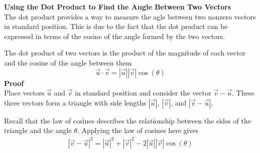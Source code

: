 \documentclass[a4paper]{article}
\let\bf\textbf
\begin{document}
\noindent\bf{Using the Dot Product to Find the Angle Between Two Vectors}
\vspace{1mm}\\
The dot product provides a way to measure the agle between two nonzero vectors in standard position. This is due to the fact that the dot product can be expressed in terms of the cosine of the angle formed by the two vectors.
\begin{center}
\end{center}
\noindent The dot product of two vectors is the product of the magnitude of each vector and the cosine of the angle between them
\setcounter{equation}{3}
\begin{equation}
    \vec{u} \cdot \vec{v} = |\vec{u}||\vec{v}|\cos(\theta)
\end{equation}
\newpage
\noindent\bf{Proof}
\vspace{1mm}\\
Place vectors $\vec{u}$ and $\vec{v}$ in standard position and consider the vector $\vec{v} - \vec{u}$. These three vectors form a triangle with side lengths $|\vec{u}|,\ |\vec{v}|$, and $|\vec{v} - \vec{u}|$.
\begin{center}
\end{center}
Recall that the law of cosines describes the relationship between the sides of the triangle and the angle $\theta$. Applying the law of cosines here gives
\begin{align*}
    |\vec{v} - \vec{u}|^2 = |\vec{u}|^2 + |\vec{v}|^2 - 2|\vec{u}||\vec{v}|\cos(\theta)
\end{align*}
\end{document}
